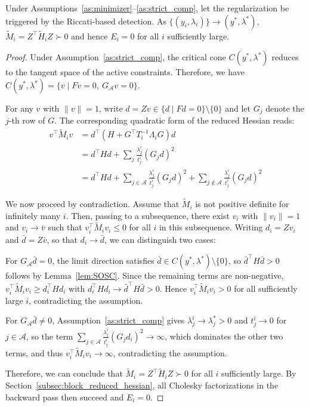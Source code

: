 \documentclass[class=scrbook, crop=false]{standalone}
\begin{document}
\begin{proposition}
    \label{prop:vanish}
    Under Assumptions~\ref{as:minimizer}--\ref{as:strict_comp}, let the regularization be triggered by the Riccati-based detection.
    As $\{(y_i, \lambda_i)\} \to (y^*, \lambda^*)$, $\tilde{M}_i = Z^\top \tilde{H}_i Z \succ 0$ and hence $E_i = 0$ for all $i$ sufficiently large.
\end{proposition}

\begin{proof}
    Under Assumption~\ref{as:strict_comp}, the critical cone $C(y^*,\lambda^*)$ reduces to the tangent space of the active constraints. 
    Therefore, we have $C(y^*,\lambda^*) = \{v \mid F v = 0,\ G_{\mathcal{A}} v = 0\}$.

    For any $v$ with $\|v\| = 1$, write $d = Zv \in \{d \mid Fd = 0\} \setminus \{0\}$
    and let $G_j$ denote the $j$-th row of $G$.
    The corresponding quadratic form of the reduced Hessian reads:
    \begin{align*}
        v^\top \tilde{M}_i v &= d^\top (H + G^\top T_i^{-1} \Lambda_i  G) d \\
                             &= d^\top H d + \sum_{j} \frac{\lambda_j^i}{t_j^i} (G_j d)^2 \\
                             &= d^\top H d + \sum_{j \in \mathcal{A}} \frac{\lambda_j^i}{t_j^i} (G_j d)^2 + \sum_{j \notin \mathcal{A}} \frac{\lambda_j^i}{t_j^i} (G_j d)^2
    \end{align*}

    We now proceed by contradiction. Assume that $\tilde{M}_i$ is not positive definite for infinitely many $i$.
    Then, passing to a subsequence, there exist $v_i$ with $\|v_i\| = 1$ and $v_i \to \bar{v}$
    such that $v_i^\top \tilde{M}_i v_i \leq 0$ for all $i$ in this subsequence.
    Writing $d_i = Z v_i$ and $\bar{d} = Z \bar{v}$, so that $d_i \to \bar{d}$, we can distinguish two cases:

    For $G_{\mathcal{A}}\bar{d}=0$, the limit direction satisfies $\bar{d} \in C(y^*,\lambda^*) \setminus \{0\}$,
    so $\bar{d}^\top H \bar{d} > 0$ follows by Lemma~\ref{lem:SOSC}.
    Since the remaining terms are non-negative, $v_i^\top \tilde{M}_i v_i \ge d_i^\top H d_i$ 
    with $d_i^\top H d_i \to \bar{d}^\top H \bar{d} > 0$.
    Hence $v_i^\top \tilde{M}_i v_i > 0$ for all sufficiently large $i$, contradicting the assumption.

    For $G_{\mathcal{A}}\bar{d} \neq 0$, Assumption~\ref{as:strict_comp} gives $\lambda_j^i \to \lambda_j^* > 0$ and $t_j^i \to 0$ for $j \in \mathcal{A}$,
    so the term $\sum_{j \in \mathcal{A}} \frac{\lambda_j^i}{t_j^i} (G_j d_i)^2 \rightarrow \infty$, 
    which dominates the other two terms, and thus $v_i^\top \tilde{M}_i v_i \rightarrow \infty$, contradicting the assumption.

    Therefore, we can conclude that $\tilde{M}_i = Z^\top \tilde{H}_i Z \succ 0$ for all $i$ sufficiently large.
    By Section~\ref{subsec:block_reduced_hessian}, all Cholesky factorizations in the backward pass then succeed and $E_i = 0$.
\end{proof}
\end{document}
